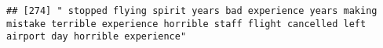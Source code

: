 \documentclass[
]{article}
\begin{document}
\begin{verbatim}
## [274] " stopped flying spirit years bad experience years making mistake terrible experience horrible staff flight cancelled left airport day horrible experience"                                                                                                                                                                                                                                                                                                                                                                                                                                                                                                                                                                                                                                                                                                                                                                                                                                                                                                                                                                                                                                                                                                                                                                                                                                                                                                                                                                                                                                                                                                                                                                                                                                     

\end{verbatim}
\end{document}
